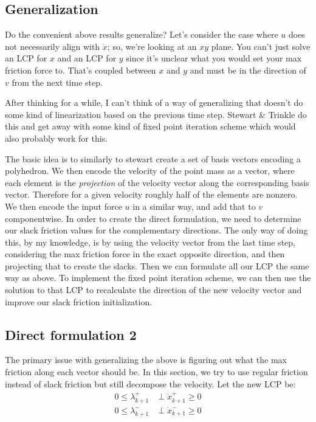 \documentclass{article}
\begin{document}
\subsection{Generalization}
Do the convenient above results generalize? Let's consider the case where $u$ does not necessarily align with $\dot x$; so, we're looking at an $xy$ plane. You can't just solve an LCP for $x$ and an LCP for $y$ since it's unclear what you would set your max friction force to. That's coupled between $x$ and $y$ and must be in the direction of $v$ from the next time step. 

After thinking for a while, I can't think of a way of generalizing that doesn't do some kind of linearization based on the previous time step. Stewart \& Trinkle do this and get away with some kind of fixed point iteration scheme which would also probably work for this.

The basic idea is to similarly to stewart create a set of basis vectors encoding a polyhedron. We then encode the velocity of the point mass as a vector, where each element is the \textit{projection} of the velocity vector along the corresponding basis vector. Therefore for a given velocity roughly half of the elements are nonzero. We then encode the input force $u$ in a similar way, and add that to $v$ componentwise. In order to create the direct formulation, we need to determine our slack friction values for the complementary directions. The only way of doing this, by my knowledge, is by using the velocity vector from the last time step, considering the max friction force in the exact opposite direction, and then projecting that to create the slacks. Then we can formulate all our LCP the same way as above. To implement the fixed point iteration scheme, we can then use the solution to that LCP to recalculate the direction of the new velocity vector and improve our slack friction initialization.

\subsection{Direct formulation 2}
The primary issue with generalizing the above is figuring out what the max friction along each vector should be. In this section, we try to use regular friction instead of slack friction but still decompose the velocity. Let the new LCP be:
\begin{align*}
    0 \leq \lambda_{k+1}^+ &\perp \dot x_{k+1}^+ \geq 0 \\
    0 \leq \lambda_{k+1}^- &\perp \dot x_{k+1}^- \geq 0
\end{align*}
\end{document}

